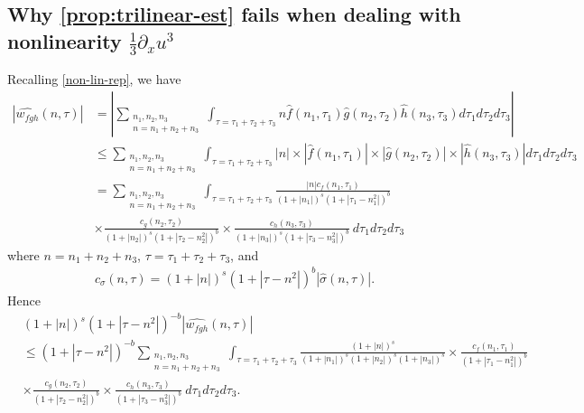 \documentclass[12pt,reqno]{amsart}
\numberwithin{equation}{section}  %
\numberwithin{figure}{section}
\newcommand{\wh}{\widehat}
\newcommand{\p}{\partial}
\theoremstyle{plain}
\theoremstyle{definition}
\theoremstyle{remark}
\begin{document}
\subsection{Why \autoref{prop:trilinear-est} fails when dealing
with nonlinearity $\frac{1}{3} \p_x u^3$}
%
%
%
Recalling \eqref{non-lin-rep}, we have
\begin{equation}
	\begin{split}
		| \wh{w_{fgh}}(n, \tau)|
		& = | \sum_{\substack{n_1,n_2,n_3\\n = n_1 + n_2 + n_3}}  \int_{\tau=\tau_1 + \tau_2 + \tau_3} n \wh{f}\left( n_1,  \tau_1 
\right) \wh{g}\left( n_2, \tau_2  
\right) \wh{h}\left( n_3, \tau_3 \right) d \tau_1 d \tau_2 d \tau_3 |
\\
& \le \sum_{\substack{n_1,n_2,n_3\\n = n_1 + n_2 + n_3}}  \int_{\tau=\tau_1 + \tau_2 + \tau_3} | n | \times | \wh{f}\left( n_1, \tau_1 
\right) | \times  | \wh{g}\left( n_2, \tau_2 
\right) | \times | \wh{ h}\left( n_3, \tau_3 \right) | d \tau_1 d \tau_2 d 
\tau_3
\\
& = \sum_{\substack{n_1,n_2,n_3\\n = n_1 + n_2 + n_3}} \int_{\tau=\tau_1 + \tau_2 + \tau_3} \frac{| n |c_f\left( n_1, \tau_1 
\right)}{\left (1 + |n_1| \right )^s \left( 1 + | \tau_1 - n_1^2 | \right)^{b}}
\\
& \times \frac{c_{g}\left( n_2, \tau_2 \right)}{\left (1 + |n_2| \right ) 
^s\left( 1 + | \tau_2 -  n_2^2| 
\right)^{b}}
 \times \frac{c_{h}\left( n_3, \tau_3 \right)}{\left (1 + |n_3| \right ) ^s\left( 1 + | 
\tau_3 - n_3^2 | \right)^{b}} \ d \tau_1 d \tau_2 d \tau_3
\end{split}
\end{equation}
where $n = n_1 + n_2 + n_3$, $\tau = \tau_1 + \tau_2 + \tau_3$, and 
%
%
\begin{equation*}
	\begin{split}
		c_\sigma(n, \tau) = \left (1 + |n| \right ) ^s \left( 1 + | \tau - n^2 |  
		\right)^{b} | \wh{\sigma}\left( n, \tau \right) | .
	\end{split}
\end{equation*}
%
%
Hence
%
%
\begin{equation*}
	\begin{split}
		 & \left (1 + |n| \right )^s \left( 1 + | \tau - n^2 | \right)^{-b} | \wh{w_{fgh}}\left( 
		n, \tau \right) |
		\\
		& \le \left( 1 + | \tau - n^2 | \right)^{-b}
		\sum_{\substack{n_1,n_2,n_3\\n = n_1 + n_2 + n_3}} \int_{\tau=\tau_1 + \tau_2 + \tau_3} \frac{\left (1 + |n| \right )^s}{\left (1 +
		|n_1| \right )^s \left (1 + | n_2| \right )^s \left (1 + |n_3| \right )^s} 
		\times \frac{c_f(n_1, \tau_1)}{\left( 1 + | \tau_1 - n_1^2 | 
		\right)^{b}}
		\\
		& \times
		\frac{c_g(n_2, \tau_2)}{\left( 1 + | \tau_2 - n_2^2 | 
		\right)^{b}} \times
		\frac{c_h(n_3, \tau_3)}{\left( 1 + | \tau_3 - n_3^2 | 
		\right)^{b}}\ d \tau_1 d \tau_2 d \tau_3.
	\end{split}
\end{equation*}
\end{document}
